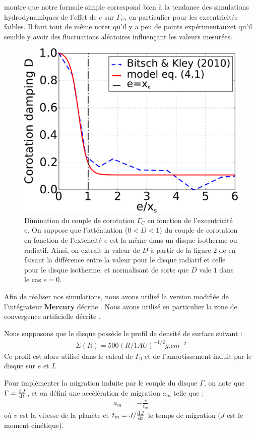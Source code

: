  montre que notre formule simple  correspond bien à la tendance des simulations hydrodynamiques de l'effet de $e$ sur $\Gamma_C$, en particulier pour les excentricités faibles. Il faut tout de même noter qu'il y a peu de points \og expérimentaux\fg et qu'il semble y avoir des fluctuations aléatoires influençant les valeurs mesurées.

\begin{figure}[htbp]
\centering
\includegraphics[width=0.49\linewidth]{figure/shifted/corotation_damping_profile.pdf}
\caption{Diminution du couple de corotation $\Gamma_C$ en fonction de l'excentricité $e$. On suppose que l'atténuation ($0<D<1$) du couple de corotation en fonction de l'extencité $e$ est la même dans un disque isotherme ou radiatif. Ainsi, on extrait la valeur de $D$ à partir de la figure 2 de \cite{bitsch2010orbital} en faisant la différence entre la valeur pour le disque radiatif et celle pour le disque isotherme, et normalisant de sorte que $D$ vale $1$ dans le cas $e=0$.}\label{fig:shifted_CZ_D_profile}
\end{figure}

\bigskip

Afin de réaliser nos simulations, nous avons utilisé la version modifiée de l'intégrateur \textbf{Mercury}\citep{chambers1999hybrid} décrite . Nous avons utilisé en particulier la zone de convergence artificielle décrite . 

Nous supposons que le disque possède le profil de densité de surface suivant :
\begin{align}
\Sigma(R) = 500 \left(R/1\unit{AU}\right)^{-1/2} \unit{g.cm^{-2}}
\end{align}
Ce profil est alors utilisé dans le calcul de $\Gamma_0$ et de l'amortissement induit par le disque sur $e$ et $I$.

Pour implémenter la migration induite par le couple du disque $\Gamma$, on note que $\Gamma=\od{J}{t}$, et on défini une accélération de migration $a_m$ telle que\citep[eq. (14)]{cresswell2008three} :
\begin{align}
a_m &= - \frac{v}{t_m}
\end{align}
où $v$ est la vitesse de la planète et $t_m=J/\od{J}{t}$ le temps de migration ($J$ est le moment cinétique).

